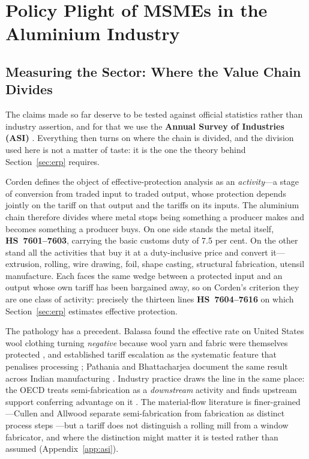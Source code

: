\documentclass[11pt, a4paper]{article}
\numberwithin{figure}{section}
\numberwithin{table}{section}
\begin{document}
\section{Policy Plight of MSMEs in the Aluminium Industry}

\subsection{Measuring the Sector: Where the Value Chain Divides}
\label{sec:asi_method}

The claims made so far deserve to be tested against official statistics rather than industry assertion, and for that we use the \textbf{Annual Survey of Industries (ASI)} \cite{asi2024}. Everything then turns on where the chain is divided, and the division used here is not a matter of taste: it is the one the theory behind Section~\ref{sec:erp} requires.

Corden \cite{corden1966} defines the object of effective-protection analysis as an \emph{activity}---a stage of conversion from traded input to traded output, whose protection depends jointly on the tariff on that output and the tariffs on its inputs. The aluminium chain therefore divides where metal stops being something a producer makes and becomes something a producer buys. On one side stands the metal itself, \textbf{HS~7601--7603}, carrying the basic customs duty of 7.5 per cent. On the other stand all the activities that buy it at a duty-inclusive price and convert it---extrusion, rolling, wire drawing, foil, shape casting, structural fabrication, utensil manufacture. Each faces the same wedge between a protected input and an output whose own tariff has been bargained away, so on Corden's criterion they are one class of activity: precisely the thirteen lines \textbf{HS~7604--7616} on which Section~\ref{sec:erp} estimates effective protection.

The pathology has a precedent. Balassa found the effective rate on United States wool clothing turning \emph{negative} because wool yarn and fabric were themselves protected \cite{balassa1965}, and established tariff escalation as the systematic feature that penalises processing \cite{balassa1968}; Pathania and Bhattacharjea document the same result across Indian manufacturing \cite{pathania2020}. Industry practice draws the line in the same place: the OECD treats semi-fabrication as a \emph{downstream} activity and finds upstream support conferring advantage on it \cite{oecd2019}. The material-flow literature is finer-grained---Cullen and Allwood separate semi-fabrication from fabrication as distinct process steps \cite{cullen2013,bertram2009}---but a tariff does not distinguish a rolling mill from a window fabricator, and where the distinction might matter it is tested rather than assumed (Appendix~\ref{app:asi}).
\end{document}
